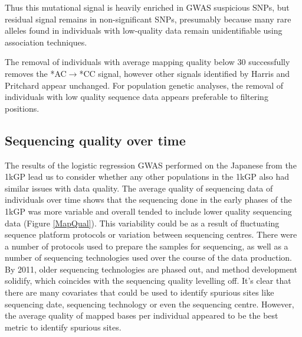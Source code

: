 \documentclass[9pt,lineno]{elife}
\begin{document}
Thus this mutational signal is heavily enriched in GWAS suspicious SNPs, but residual signal remains in non-significant SNPs, presumably because many rare alleles found in individuals with low-quality data remain unidentifiable using association techniques. 

The removal of individuals with average mapping quality below 30 successfully removes the *AC${\rightarrow}$*CC signal, however other signals identified by Harris and Pritchard appear unchanged. 
For population genetic analyses, the removal of individuals with low quality sequence data appears preferable to filtering positions. 

	\subsection{Sequencing quality over time}
The results of the logistic regression GWAS performed on the Japanese from the 1kGP lead us to consider whether any other populations in the 1kGP also had similar issues with data quality.
The average quality of sequencing data of individuals over time shows that the sequencing done in the early phases of the 1kGP was more variable and overall tended to include lower quality sequencing data (Figure \ref{MapQual}).
This variability could be as a result of fluctuating sequence platform protocols or variation between sequencing centres.
There were a number of protocols used to prepare the samples for sequencing, as well as a number of sequencing technologies used over the course of the data production.
By 2011, older sequencing technologies are phased out, and method development solidify, which coincides with the sequencing quality levelling off.
It's clear that there are many covariates that could be used to identify spurious sites like sequencing date, sequencing technology or even the sequencing centre. 
However, the average quality of mapped bases per individual appeared to be the best metric to identify spurious sites.
\end{document}
